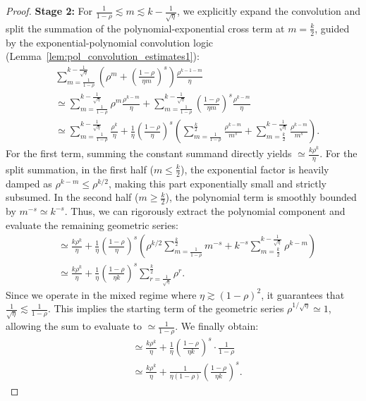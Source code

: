 \begin{proof}
\textbf{Stage 2:} For $\frac{1}{1-\rho} \lesssim m \lesssim k - \frac{1}{\sqrt{\eta}}$, we explicitly expand the convolution and split the summation of the polynomial-exponential cross term at $m = \frac{k}{2}$, guided by the exponential-polynomial convolution logic (Lemma~\ref{lem:pol_convolution_estimates1}):
\begin{align*}
    &\sum_{m=\frac{1}{1-\rho}}^{k-\frac{1}{\sqrt{\eta}}} \left(\rho^m + \left(\frac{1-\rho}{\eta m}\right)^s\right) \frac{\rho^{k-1-m}}{\eta}\\
    &\simeq \sum_{m=\frac{1}{1-\rho}}^{k-\frac{1}{\sqrt{\eta}}} \rho^m \frac{\rho^{k-m}}{\eta} + \sum_{m=\frac{1}{1-\rho}}^{k-\frac{1}{\sqrt{\eta}}} \left(\frac{1-\rho}{\eta m}\right)^s \frac{\rho^{k-m}}{\eta} \\
    &\simeq \sum_{m=\frac{1}{1-\rho}}^{k-\frac{1}{\sqrt{\eta}}} \frac{\rho^k}{\eta} + \frac{1}{\eta} \left(\frac{1-\rho}{\eta}\right)^s \left( \sum_{m=\frac{1}{1-\rho}}^{\frac{k}{2}} \frac{\rho^{k-m}}{m^s} + \sum_{m=\frac{k}{2}}^{k-\frac{1}{\sqrt{\eta}}} \frac{\rho^{k-m}}{m^s} \right).
\end{align*}
For the first term, summing the constant summand directly yields $\simeq \frac{k\rho^k}{\eta}$. For the split summation, in the first half ($m \le \frac{k}{2}$), the exponential factor is heavily damped as $\rho^{k-m} \le \rho^{k/2}$, making this part exponentially small and strictly subsumed. In the second half ($m \ge \frac{k}{2}$), the polynomial term is smoothly bounded by $m^{-s} \simeq k^{-s}$. Thus, we can rigorously extract the polynomial component and evaluate the remaining geometric series:
\begin{align*}
    &\simeq \frac{k\rho^k}{\eta} + \frac{1}{\eta} \left(\frac{1-\rho}{\eta}\right)^s \left( \rho^{k/2} \sum_{m=\frac{1}{1-\rho}}^{\frac{k}{2}} m^{-s} + k^{-s} \sum_{m=\frac{k}{2}}^{k-\frac{1}{\sqrt{\eta}}} \rho^{k-m} \right) \\
    &\simeq \frac{k\rho^k}{\eta} + \frac{1}{\eta} \left(\frac{1-\rho}{\eta k}\right)^s \sum_{r=\frac{1}{\sqrt{\eta}}}^{\frac{k}{2}} \rho^r .
\end{align*}
Since we operate in the mixed regime where $\eta \gtrsim (1-\rho)^2$, it guarantees that $\frac{1}{\sqrt{\eta}} \lesssim \frac{1}{1-\rho}$. This implies the starting term of the geometric series $\rho^{1/\sqrt{\eta}} \simeq 1$, allowing the sum to evaluate to $\simeq \frac{1}{1-\rho}$. We finally obtain:
\begin{align*}
    &\simeq \frac{k\rho^k}{\eta} + \frac{1}{\eta} \left(\frac{1-\rho}{\eta k}\right)^s \cdot \frac{1}{1-\rho} \\
    &\simeq \frac{k\rho^k}{\eta} + \frac{1}{\eta(1-\rho)} \left(\frac{1-\rho}{\eta k}\right)^s.
\end{align*}


\end{proof}
